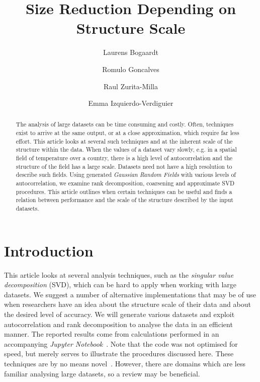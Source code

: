 \documentclass[sigconf]{acmart}
\begin{document}
\title{Size Reduction Depending on Structure Scale}

\author{Laurens Bogaardt}

\author{Romulo Goncalves}

\author{Raul Zurita-Milla}

\author{Emma Izquierdo-Verdiguier}

\begin{abstract}
The analysis of large datasets can be time consuming and costly. Often, techniques exist to arrive at the same output, or at a close approximation, which require far less effort. This article looks at several such techniques and at the inherent scale of the structure within the data. When the values of a dataset vary slowly, e.g. in a spatial field of temperature over a country, there is a high level of autocorrelation and the structure of the field has a large scale. Datasets need not have a high resolution to describe such fields. Using generated \textit{Gaussian Random Fields} with various levels of autocorrelation, we examine rank decomposition, coarsening and approximate SVD procedures. This article outlines when certain techniques can be useful and finds a relation between performance and the scale of the structure described by the input datasets.
\end{abstract}


\maketitle

\section{Introduction}
\label{sec:Introduction}

This article looks at several analysis techniques, such as the \textit{singular value decomposition} (SVD), which can be hard to apply when working with large datasets. We suggest a number of alternative implementations that may be of use when researchers have an idea about the structure scale of their data and about the desired level of accuracy. We will generate various datasets and exploit autocorrelation and rank decomposition to analyse the data in an efficient manner. The reported results come from calculations performed in an accompanying \textit{Jupyter Notebook}~\cite{Bogaardt2018}. Note that the code was not optimised for speed, but merely serves to illustrate the procedures discussed here. These techniques are by no means novel~\cite{Golub1970, Bjorck1973, Chan1982}. However, there are domains which are less familiar analysing large datasets, so a review may be beneficial.
\end{document}
